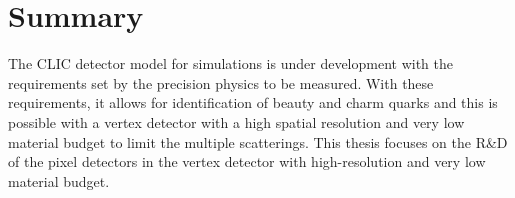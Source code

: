 \section{Summary}
\label{sec:summary_CLIC}

The CLIC detector model for simulations is under development with the
requirements set by the precision physics to be measured. With these
requirements, it allows for identification of beauty and charm quarks
and this is possible with a vertex detector with a high spatial
resolution and very low material budget to limit the multiple
scatterings. This thesis focuses on the R\&D of the pixel detectors in
the vertex detector with high-resolution and very low material budget.





